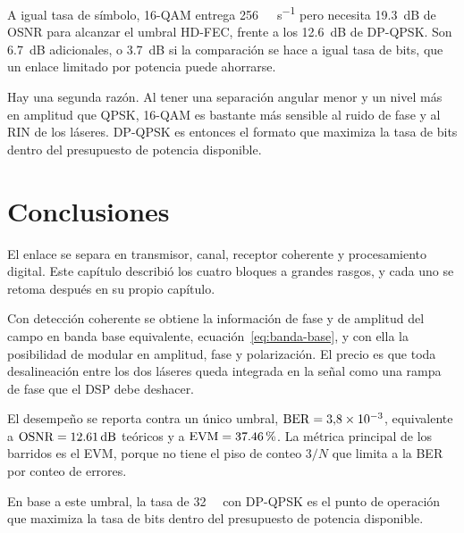 A igual tasa de s\'imbolo, 16-QAM entrega \SI{256}{\giga\bit\per\second} pero
necesita \SI{19.3}{\dB} de OSNR para alcanzar el umbral HD-FEC, frente a los
\SI{12.6}{\dB} de DP-QPSK. Son \SI{6.7}{\dB} adicionales, o \SI{3.7}{\dB} si la
comparaci\'on se hace a igual tasa de bits, que un enlace limitado
por potencia puede ahorrarse.

Hay una segunda raz\'on. Al tener una separaci\'on angular menor y un nivel
m\'as en amplitud que QPSK, 16-QAM es bastante m\'as sensible al ruido de fase
y al RIN de los l\'aseres. DP-QPSK es entonces el formato que maximiza la tasa
de bits dentro del presupuesto de potencia disponible.

\section{Conclusiones}
\label{sec:coh-conclusiones}

El enlace se separa en transmisor, canal, receptor coherente y procesamiento
digital. Este cap\'itulo describi\'o los cuatro bloques a grandes rasgos, y cada uno
se retoma despu\'es en su propio cap\'itulo.

Con detecci\'on coherente se obtiene la informaci\'on de fase y de amplitud del
campo en banda base equivalente, ecuaci\'on~\eqref{eq:banda-base}, y con ella
la posibilidad de modular en amplitud, fase y polarizaci\'on. El precio es que
toda desalineaci\'on entre los dos l\'aseres queda integrada en la se\~nal como
una rampa de fase que el DSP debe deshacer.

El desempe\~no se reporta contra un \'unico umbral,
$\mathrm{BER} = 3{,}8\times10^{-3}$, equivalente a $\OSNR = \SI{12.61}{\dB}$
te\'oricos y a $\mathrm{EVM} = \SI{37.46}{\percent}$. La m\'etrica principal de los
barridos es el EVM, porque no tiene el piso de conteo $3/N$ que limita a la BER
por conteo de errores.

En base a este umbral, la tasa de \SI{32}{\giga\baud} con DP-QPSK es el punto de operaci\'on que
maximiza la tasa de bits dentro del presupuesto de potencia disponible.